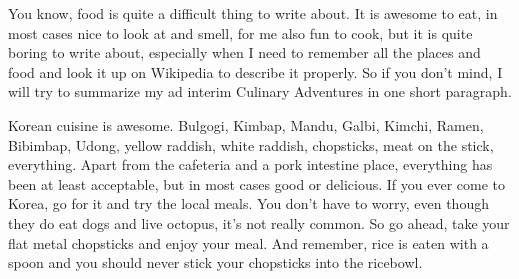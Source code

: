 \begin{post}
\begin{content}
You know, food is quite a difficult thing to write about. It is awesome to eat, in most cases nice to look at and smell, for me also fun to cook, but it is quite boring to write about, especially when I need to remember all the places and food and look it up on Wikipedia to describe it properly. So if you don't mind, I will try to summarize my ad interim Culinary Adventures in one short paragraph.

Korean cuisine is awesome. Bulgogi, Kimbap, Mandu, Galbi, Kimchi, Ramen, Bibimbap, Udong, yellow raddish, white raddish, chopsticks, meat on the stick, everything. Apart from the cafeteria and a pork intestine place, everything has been at least acceptable, but in most cases good or delicious. If you ever come to Korea, go for it and try the local meals. You don't have to worry, even though they do eat dogs and live octopus, it's not really common. So go ahead, take your flat metal chopsticks and enjoy your meal. And remember, rice is eaten with a spoon and you should never stick your chopsticks into the ricebowl.
	\end{content}
\end{post}
